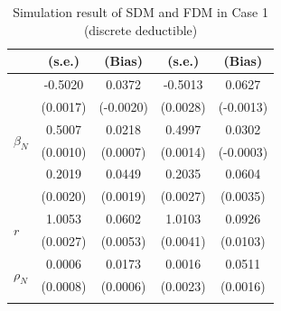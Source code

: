 \documentclass[11pt]{article}
\begin{document}
\begin{table}[!ht]
{{\begin{minipage}{0.5\textwidth}
\begin{tabular}{lcccc}
        & (s.e.) & (Bias) & (s.e.) & (Bias) \\
        \midrule
        \multirow{6}{*}{$\beta_N$} & -0.5020 & 0.0372 & -0.5013 & 0.0627 \\
         & (0.0017) & (-0.0020) & (0.0028) & (-0.0013) \\
        \cmidrule{2-5}
         & 0.5007 & 0.0218 & 0.4997 & 0.0302 \\
         & (0.0010) & (0.0007) & (0.0014) & (-0.0003) \\
        \cmidrule{2-5}
         & 0.2019 & 0.0449 & 0.2035 & 0.0604 \\
         & (0.0020) & (0.0019) & (0.0027) & (0.0035) \\
        \midrule
        \multirow{2}{*}{$r$} & 1.0053 & 0.0602 & 1.0103 & 0.0926 \\
         & (0.0027) & (0.0053) & (0.0041) & (0.0103) \\
        \midrule
        \multirow{2}{*}{$\rho_N$} & 0.0006 & 0.0173 & 0.0016 & 0.0511 \\
         & (0.0008) & (0.0006) & (0.0023) & (0.0016) \\
        \hhline{=====}
        \end{tabular}
    \end{minipage}
}
}
\caption{Simulation result of SDM and FDM in Case 1 (discrete deductible)}\label{tab:AppSimEndCase1}
\end{table}
\end{document}
